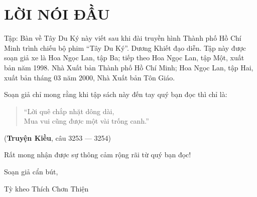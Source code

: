 \chapter*{LỜI NÓI ĐẦU} %
\label{cha:loi_noi_dau}

Tập: Bàn về Tây Du Ký này viết sau khi đài truyền hình Thành phố Hồ Chí Minh trình chiếu bộ phim ``Tây Du Ký''. Dương Khiết đạo diễn. Tập này được soạn giả xe là Hoa Ngọc Lan, tập Ba; tiếp theo Hoa Ngọc Lan, tập Một, xuất bản năm 1998. Nhà Xuất bản Thành phố Hồ Chí Minh; Hoa Ngọc Lan, tập Hai, xuất bản tháng 03 năm 2000, Nhà Xuất bản Tôn Giáo.

Soạn giả chỉ mong rằng khi tập sách này đến tay quý bạn đọc thì chỉ là:

\begin{verse}
\begin{itshape}
``Lời quê chắp nhặt dông dài,\\
Mua vui cũng được một vài trống canh.''
\end{itshape}
\end{verse}

\hfill
({\bf Truyện Kiều}, câu 3253 — 3254)

Rất mong nhận được sự thông cảm rộng rãi từ quý bạn đọc!

\vfill
\hfill
\begin{minipage}{0.6\textwidth}
\begin{center}
Soạn giả cẩn bút,

Tỳ kheo Thích Chơn Thiện
\end{center}
\end{minipage}
\vfill
